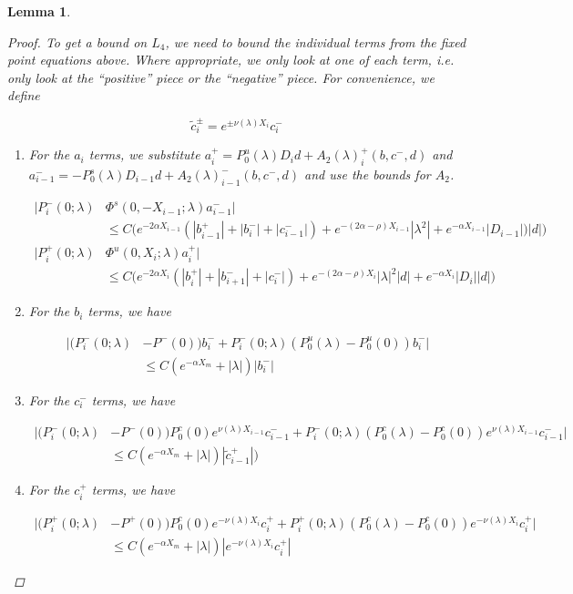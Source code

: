 \documentclass[12pt]{article}
\newtheorem{lemma}{Lemma}
\begin{document}
\begin{lemma}
\begin{proof}
To get a bound on $L_4$, we need to bound the individual terms from the fixed point equations above. Where appropriate, we only look at one of each term, i.e. only look at the ``positive'' piece or the ``negative'' piece. For convenience, we define

\[
\tilde{c}_i^\pm = e^{\pm \nu(\lambda) X_i} c_i^-
\]

\begin{enumerate}

\item For the $a_i$ terms, we substitute $a_i^+ = P_0^u(\lambda) D_i d + A_2(\lambda)_i^+(b, c^-, d)$ and $a_{i-1}^- = -P_0^s(\lambda) D_{i-1} d + A_2(\lambda)_{i-1}^-(b, c^-, d)$ and use the bounds for $A_2$.

\begin{align*}
|P_i^-(0; \lambda) &\Phi^s(0, -X_{i-1}; \lambda) a_{i-1}^-| \\
&\leq C \Big( e^{-2 \alpha X_{i-1}} (|b_{i-1}^+| + |b_i^-| + |c_{i-1}^-|) + e^{-(2 \alpha - \rho) X_{i-1}} |\lambda^2| + e^{-\alpha X_{i-1}}|D_{i-1}|)|d| \Big) \\
|P_i^+(0; \lambda) &\Phi^u(0, X_i; \lambda) a_i^+| \\
&\leq C \Big( e^{-2 \alpha X_i} (|b_i^+| + |b_{i+1}^-| + |c_i^-|) + e^{-(2 \alpha - \rho) X_i} |\lambda|^2|d| + e^{-\alpha X_i} |D_i||d| \Big)
\end{align*}

\item For the $b_i$ terms, we have

\begin{align*}
|(P_i^-(0; \lambda) &- P^-(0))b_i^- + P_i^-(0; \lambda)(P_0^u(\lambda) - P_0^u(0))b_i^-| \\
&\leq C ( e^{-\alpha X_m} + |\lambda|)|b_i^-|
\end{align*}

\item For the $c_i^-$ terms, we have

\begin{align*}
|(P_i^-(0; \lambda) &- P^-(0)) P_0^c(0) e^{\nu(\lambda) X_{i-1}} c_{i-1}^- + P_i^-(0; \lambda) (P_0^c(\lambda) - P_0^c(0)) e^{\nu(\lambda) X_{i-1}} c_{i-1}^- | \\
&\leq C (e^{-\alpha X_m} + |\lambda|)|\tilde{c}_{i-1}^+|)
\end{align*}

\item For the $c_i^+$ terms, we have

\begin{align*}
|(P_i^+(0; \lambda) &- P^+(0))P_0^c(0) e^{-\nu(\lambda)X_i} c_i^+ + P_i^+(0; \lambda) (P_0^c(\lambda) - P_0^c(0)) e^{-\nu(\lambda)X_i} c_i^+| \\
&\leq C (e^{-\alpha X_m} + |\lambda|)|e^{-\nu(\lambda)X_i} c_i^+|
\end{align*}


\end{enumerate}
\end{proof}
\end{lemma}
\end{document}
